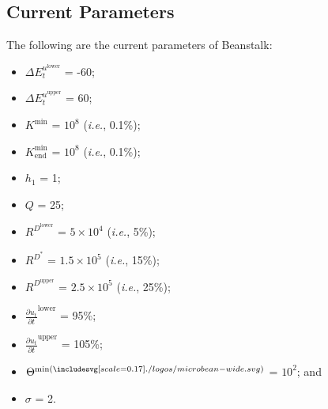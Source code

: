 \documentclass[class=article, crop=false]{standalone}
\begin{document}
\subsection{Current Parameters}
The following are the current parameters of Beanstalk:
\begin{itemize}[itemsep=3pt,leftmargin=16pt]
    \item $\Delta E_{t}^{u^{\text{lower}}}$ = -60;
    \item $\Delta E_{t}^{u^{\text{upper}}}$ = 60;
    \item \hyperlink{ht119}{$K^{\text{min}}$} = $10^8$ (\textit{i.e.}, 0.1\%);
    \item $K_{\text{end}}^{\text{min}}$ = $10^8$ (\textit{i.e.}, 0.1\%);
    \item $h_1$ = 1;
    \item $Q$ = 25;
    \item $R^{D^{\text{lower}}}$ = $5 \times 10^4$ (\textit{i.e.}, 5\%);
    \item $R^{D^*}$ = $1.5 \times 10^5$ (\textit{i.e.}, 15\%);
    \item $R^{D^{\text{upper}}}$ = $2.5 \times 10^5$ (\textit{i.e.}, 25\%);
    \item $\frac{\partial u_t}{\partial t}^{\text{lower}}$ = 95\%;
    \item $\frac{\partial u_t}{\partial t}^{\text{upper}}$ = 105\%;
    \item $\Theta^{\text{min}(\bean)}$ = $10^2$; and
    \item $\sigma$ = 2.
\end{itemize}
\end{document}
